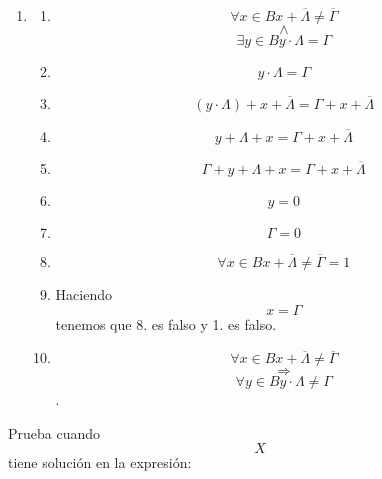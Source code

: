\begin{enumerate}
\begin{enumerate}
\begin{enumerate}
\begin{enumerate}
\begin{enumerate}
          \begin{enumerate}
          \def\labelenumvi{\arabic{enumvi}.}
          \tightlist
          \item
            \begin{enumerate}
            \def\labelenumvii{\arabic{enumvii}.}
            \tightlist
            \item
              \[\forall{x \in B}{{x + \overline{\Lambda}} \neq \overline{\Gamma}}\]\[\land\]\[\exists{y \in B}{{y \cdot \Lambda} = \Gamma}\]
            \item
              \[{y \cdot \Lambda} = \Gamma\]
            \item
              \[{{{({y \cdot \Lambda})} + x} + \overline{\Lambda}} = {{\Gamma + x} + \overline{\Lambda}}\]
            \item
              \[{{y + \Lambda} + x} = {{\Gamma + x} + \overline{\Lambda}}\]
            \item
              \[{{{\Gamma + y} + \Lambda} + x} = {{\Gamma + x} + \overline{\Lambda}}\]
            \item
              \[y = 0\]
            \item
              \[\Gamma = 0\]
            \item
              \[\forall{x \in B}{{{x + \overline{\Lambda}} \neq \overline{\Gamma}} = 1}\]
            \item
              Haciendo \[x = \Gamma\] tenemos que 8. es falso y 1. es
              falso.
            \item
              \[\forall{x \in B}{{x + \overline{\Lambda}} \neq \overline{\Gamma}}\]\[\Rightarrow\]\[\forall{y \in B}{{y \cdot \Lambda} \neq \Gamma}\].
            \end{enumerate}
          \end{enumerate}

          Prueba cuando \[X\] tiene solución en la expresión:


\end{enumerate}
\end{enumerate}
\end{enumerate}
\end{enumerate}
\end{enumerate}
